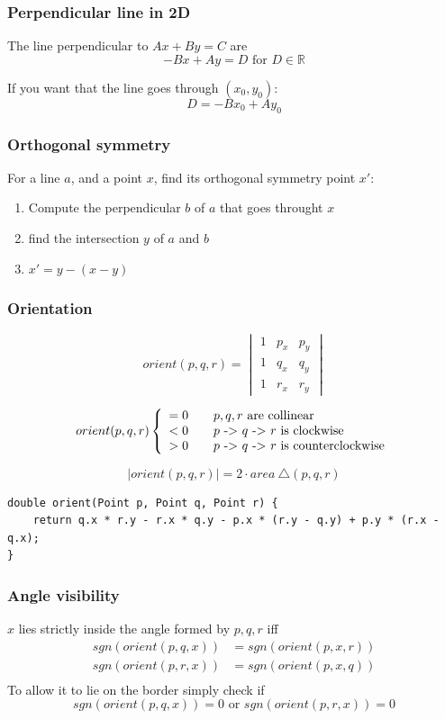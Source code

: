 \documentclass[pdf]{beamer}
\begin{document}
\begin{frame}
	\frametitle{Perpendicular line in 2D}
	The line perpendicular to $Ax+By=C$ are
	$$-Bx+Ay=D \text{ for } D \in \mathbb{R}$$
	
	If you want that the line goes through $(x_0, y_0)$:
	$$D=-Bx_0+Ay_0$$
\end{frame}

\begin{frame}
	\frametitle{Orthogonal symmetry}
	For a line $a$, and a point $x$, find its orthogonal symmetry point $x'$:
	
	\begin{enumerate}
		\item Compute the perpendicular $b$ of $a$ that goes throught $x$
		\item find the intersection $y$ of $a$ and $b$
		\item $x'=y-(x-y)$
	\end{enumerate}
\end{frame}
\begin{frame}[fragile]
	\frametitle{Orientation}
	$$
	orient(p, q, r) = 
	\begin{vmatrix}
	1 & p_x & p_y \\
	1 & q_x & q_y \\
	1 & r_x & r_y
	\end{vmatrix}
	$$
	
	$$
	orient(p, q, r) \left\{
	\begin{array}{l l l}
	= 0 \quad & \text{$p, q, r$ are collinear} \\
	< 0 \quad & \text{$p$ -> $q$ -> $r$ is clockwise} \\
	> 0 \quad & \text{$p$ -> $q$ -> $r$ is counterclockwise}
	\end{array} \right.
	$$
	
	$$
	|orient(p, q, r)| = 2 \cdot area \ \triangle(p, q, r)
	$$
	
	\begin{lstlisting}
double orient(Point p, Point q, Point r) {
    return q.x * r.y - r.x * q.y - p.x * (r.y - q.y) + p.y * (r.x - q.x);
}
	\end{lstlisting}
\end{frame}

\begin{frame}
	\frametitle{Angle visibility}
	$x$ lies strictly inside the angle formed by $p, q, r$ iff
	\begin{align*}
	sgn(orient(p, q, x)) & = sgn(orient(p, x, r)) \\
	sgn(orient(p, r, x)) & = sgn(orient(p, x, q)) \\
	\end{align*}
	To allow it to lie on the border simply check if $$sgn(orient(p, q, x)) = 0 \text{ or } sgn(orient(p, r, x)) = 0$$
\end{frame}
\end{document}
